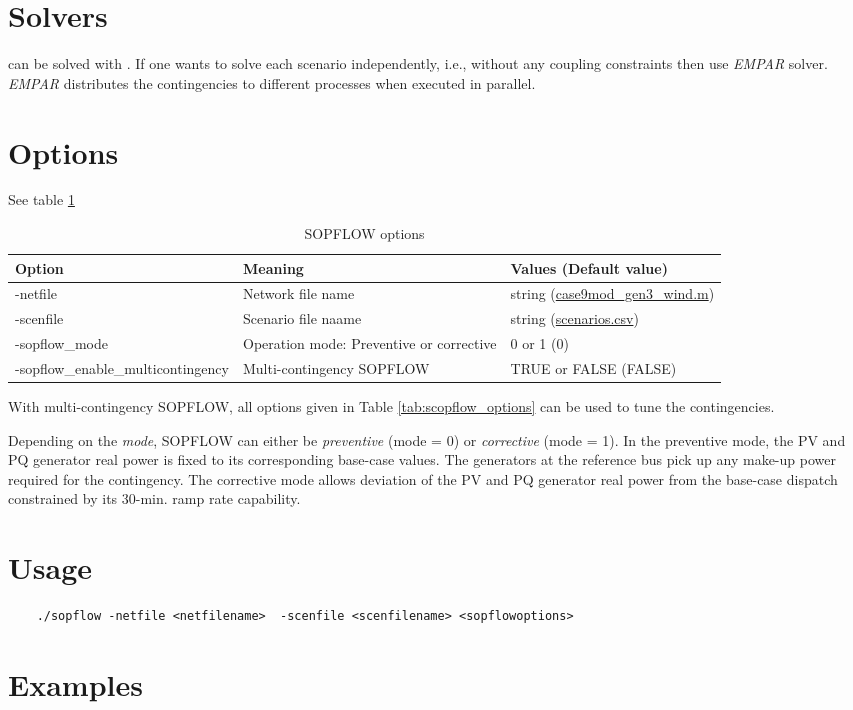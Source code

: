\section{Solvers}
\sopflow can be solved with \ipopt. If one wants to solve each scenario independently, i.e., without any coupling constraints then use \emph{EMPAR} solver. \emph{EMPAR} distributes the contingencies to different processes when executed in parallel.
\section{Options}
See table \ref{tab:sopflow_options}

\begin{table}[h]
  \caption{SOPFLOW options}
  \small
  \begin{tabular}{|p{}|p{}|p{}|}
    \hline
    \textbf{Option} & \textbf{Meaning} & \textbf{Values (Default value)} \\ \hline
    -netfile & Network file name & string (\href{https://gitlab.pnnl.gov/exasgd/frameworks/exago/-/blob/master/datafiles/case9/case9mod_gen3_wind.m}{case9mod_gen3_wind.m}) \\ \hline
    -scenfile & Scenario file naame & string (\href{https://gitlab.pnnl.gov/exasgd/frameworks/exago/-/blob/master/datafiles/case9/scenarios.csv}{scenarios.csv}) \\ \hline
    -sopflow\_mode & Operation mode: Preventive or corrective & 0 or 1 (0) \\ \hline
    -sopflow\_enable\_multicontingency & Multi-contingency SOPFLOW & TRUE or FALSE (FALSE) \\ \hline 
  \end{tabular}
  \label{tab:sopflow_options}
\end{table}

With multi-contingency SOPFLOW, all \scopflow options given in Table \ref{tab:scopflow_options} can be used to tune the contingencies.

Depending on the \emph{mode}, SOPFLOW can either be \emph{preventive} (mode = 0) or \emph{corrective} (mode = 1). In the preventive mode, the PV and PQ generator real power is fixed to its corresponding base-case values. The generators at the reference bus pick up any make-up power required for the contingency. The corrective mode allows deviation of the PV and PQ generator real power from the base-case dispatch constrained by its 30-min. ramp rate capability.

\section{Usage}
\begin{lstlisting}
    ./sopflow -netfile <netfilename>  -scenfile <scenfilename> <sopflowoptions>
\end{lstlisting}
\section{Examples}
